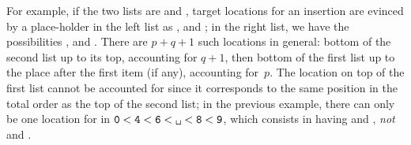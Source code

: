 For example, if the two lists are \erlcode{[6,4,0]} and
\erlcode{[8,9]}, target locations for an insertion are evinced by a
place\hyp{}holder \erlcode{\textvisiblespace} in the left list as
\erlcode{[6,\textvisiblespace,4,0]},
\erlcode{[6,4,\textvisiblespace,0]} and
\erlcode{[6,4,0,\textvisiblespace]}; in the right list, we have the
possibilities \erlcode{[\textvisiblespace,8,9]},
\erlcode{[8,\textvisiblespace,9]} and
\erlcode{[8,9,\textvisiblespace]}. There are \(p+q+1\) such locations
in general: bottom of the second list up to its top, accounting for
\(q+1\), then bottom of the first list up to the place after the first
item (if any), accounting for~\(p\). The location on top of the first
list cannot be accounted for since it corresponds to the same position
in the total order as the top of the second list; in the previous
example, there can only be one location for
\erlcode{\textvisiblespace} in \(\erlcode{0}< \erlcode{4}<
\erlcode{6}< \erlcode{\textvisiblespace}< \erlcode{8}< \erlcode{9}\),
which consists in having \erlcode{[6,4,0]} and
\erlcode{[\textvisiblespace,8,9]}, \emph{not}
\erlcode{[\textvisiblespace,6,4,0]} and \erlcode{[8,9]}.

